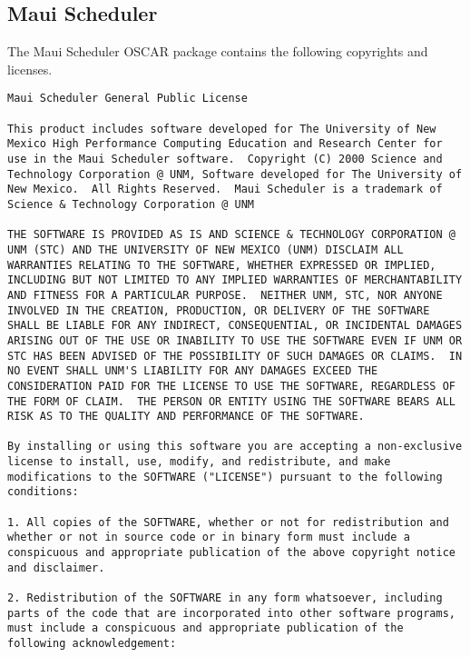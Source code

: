 %
%

\subsection{Maui Scheduler}

The Maui Scheduler OSCAR package contains the following copyrights and
licenses.

\begin{verbatim}
Maui Scheduler General Public License

This product includes software developed for The University of New
Mexico High Performance Computing Education and Research Center for
use in the Maui Scheduler software.  Copyright (C) 2000 Science and
Technology Corporation @ UNM, Software developed for The University of
New Mexico.  All Rights Reserved.  Maui Scheduler is a trademark of
Science & Technology Corporation @ UNM

THE SOFTWARE IS PROVIDED AS IS AND SCIENCE & TECHNOLOGY CORPORATION @
UNM (STC) AND THE UNIVERSITY OF NEW MEXICO (UNM) DISCLAIM ALL
WARRANTIES RELATING TO THE SOFTWARE, WHETHER EXPRESSED OR IMPLIED,
INCLUDING BUT NOT LIMITED TO ANY IMPLIED WARRANTIES OF MERCHANTABILITY
AND FITNESS FOR A PARTICULAR PURPOSE.  NEITHER UNM, STC, NOR ANYONE
INVOLVED IN THE CREATION, PRODUCTION, OR DELIVERY OF THE SOFTWARE
SHALL BE LIABLE FOR ANY INDIRECT, CONSEQUENTIAL, OR INCIDENTAL DAMAGES
ARISING OUT OF THE USE OR INABILITY TO USE THE SOFTWARE EVEN IF UNM OR
STC HAS BEEN ADVISED OF THE POSSIBILITY OF SUCH DAMAGES OR CLAIMS.  IN
NO EVENT SHALL UNM'S LIABILITY FOR ANY DAMAGES EXCEED THE
CONSIDERATION PAID FOR THE LICENSE TO USE THE SOFTWARE, REGARDLESS OF
THE FORM OF CLAIM.  THE PERSON OR ENTITY USING THE SOFTWARE BEARS ALL
RISK AS TO THE QUALITY AND PERFORMANCE OF THE SOFTWARE.

By installing or using this software you are accepting a non-exclusive
license to install, use, modify, and redistribute, and make
modifications to the SOFTWARE ("LICENSE") pursuant to the following
conditions:

1. All copies of the SOFTWARE, whether or not for redistribution and
whether or not in source code or in binary form must include a
conspicuous and appropriate publication of the above copyright notice
and disclaimer.

2. Redistribution of the SOFTWARE in any form whatsoever, including
parts of the code that are incorporated into other software programs,
must include a conspicuous and appropriate publication of the
following acknowledgement:


\end{verbatim}
